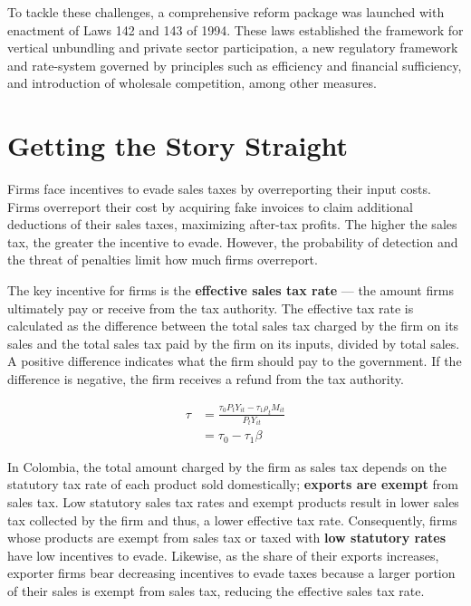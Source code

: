 \documentclass[
  12pt]{article}
\theoremstyle{definition}
\theoremstyle{remark}
\begin{document}
To tackle these challenges, a comprehensive reform package was launched
with enactment of Laws 142 and 143 of 1994. These laws established the
framework for vertical unbundling and private sector participation, a
new regulatory framework and rate-system governed by principles such as
efficiency and financial sufficiency, and introduction of wholesale
competition, among other measures.

\section{Getting the Story Straight}\label{getting-the-story-straight}

Firms face incentives to evade sales taxes by overreporting their input
costs. Firms overreport their cost by acquiring fake invoices to claim
additional deductions of their sales taxes, maximizing after-tax
profits. The higher the sales tax, the greater the incentive to evade.
However, the probability of detection and the threat of penalties limit
how much firms overreport.

The key incentive for firms is the \textbf{effective sales tax rate} ---
the amount firms ultimately pay or receive from the tax authority. The
effective tax rate is calculated as the difference between the total
sales tax charged by the firm on its sales and the total sales tax paid
by the firm on its inputs, divided by total sales. A positive difference
indicates what the firm should pay to the government. If the difference
is negative, the firm receives a refund from the tax authority.

\[
\begin{aligned}
\tau &= \frac{\tau_0P_tY_{it} - \tau_1\rho_t M_{it}}{P_tY_{it}} \\
&= \tau_0 - \tau_1 \beta
\end{aligned}
\]

In Colombia, the total amount charged by the firm as sales tax depends
on the statutory tax rate of each product sold domestically;
\textbf{exports are exempt} from sales tax. Low statutory sales tax
rates and exempt products result in lower sales tax collected by the
firm and thus, a lower effective tax rate. Consequently, firms whose
products are exempt from sales tax or taxed with \textbf{low statutory
rates} have low incentives to evade. Likewise, as the share of their
exports increases, exporter firms bear decreasing incentives to evade
taxes because a larger portion of their sales is exempt from sales tax,
reducing the effective sales tax rate.
\end{document}

